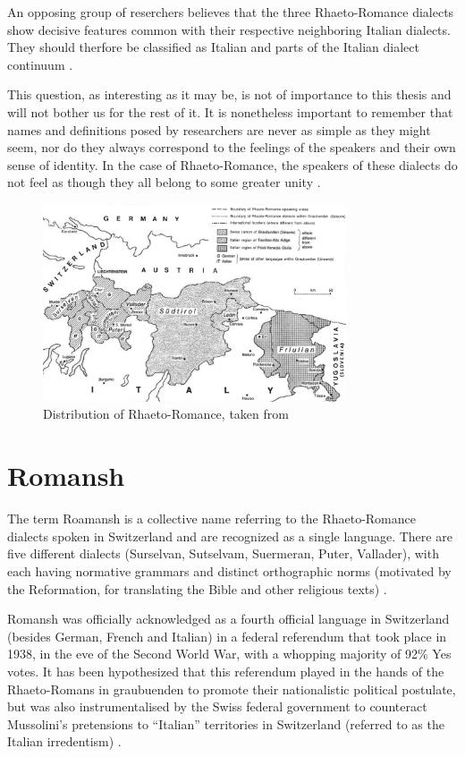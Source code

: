 An opposing group of reserchers believes that the three Rhaeto-Romance dialects show decisive  features common with their respective neighboring Italian dialects. 
They should therfore be classified as Italian and parts of the Italian dialect continuum \autocite[174]{bossong2008}.

This question, as interesting as it may be, is not of importance to this thesis and will not bother us for the rest of it.
It is nonetheless important to remember that names and definitions posed by researchers are never as simple as they might seem, nor do they always correspond to the feelings of the speakers and their own sense of identity. 
In the case of Rhaeto-Romance, the speakers of these dialects do not feel as though they all belong to some greater unity \autocite[175]{bossong2008}.

\begin{figure}
\centering
\includegraphics[width=0.8\textwidth]{graphics/raeto-map.png}
\caption{Distribution of Rhaeto-Romance, taken from \cite[2]{haiman1992}}
\label{fig:raeto-map}
\end{figure}

\section{Romansh}
The term Roamansh is a collective name referring to the Rhaeto-Romance dialects spoken in Switzerland and are recognized as a single language. 
There are five different dialects (Surselvan, Sutselvam, Suermeran, Puter, Vallader), with each having normative grammars and distinct orthographic norms (motivated by the Reformation, for translating the Bible and other religious texts) \autocites[1]{haiman1992}[178]{bossong2008}.

Romansh was officially acknowledged as a fourth official language in Switzerland (besides German, French and Italian) in a federal referendum that took place in 1938, in the eve of the Second World War, with a whopping majority of 92\% Yes votes. 
It has been hypothesized that this referendum played in the hands of the Rhaeto-Romans in \Gls{graubuenden} to promote their nationalistic political postulate, but was also instrumentalised by the Swiss federal government to counteract Mussolini's pretensions to \enquote{Italian} territories in Switzerland (referred to as the Italian irredentism) \autocite{valaer2012}.


